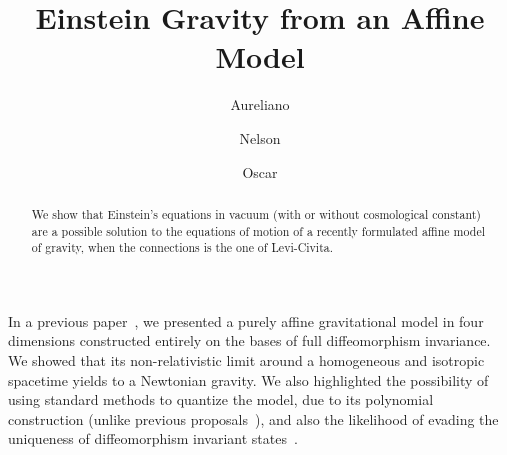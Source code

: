 \documentclass[aps,prl,twocolumn,superscriptaddress,showpacs,showkeys]{revtex4-1}
\begin{document}
\title{Einstein Gravity from an Affine Model}


\author{Aureliano }
\affiliation{\CFF}

\author{Nelson }
\affiliation{\CFF}

\author{Oscar }
\affiliation{\CCTVal}
\affiliation{\UTFSM}

\begin{abstract}
  We show that Einstein's equations in vacuum (with or without cosmological constant) are a possible solution to the equations of motion of a recently formulated affine model of gravity, when the connections is the one of Levi-Civita.
\end{abstract}



\maketitle

In a previous paper~\cite{Skirzewski:2014eta}, we presented a purely affine gravitational model in four dimensions constructed entirely on the bases of full diffeomorphism invariance. We showed that its non-relativistic limit around a homogeneous and isotropic spacetime yields to a Newtonian gravity. We also highlighted the possibility of using standard methods to quantize the model, due to its polynomial construction (unlike previous proposals~\cite{Eddington1923math,*schrodinger1950space}), and also the likelihood of evading the uniqueness of diffeomorphism invariant states~\cite{Lewandowski:2005jk}.
\end{document}

